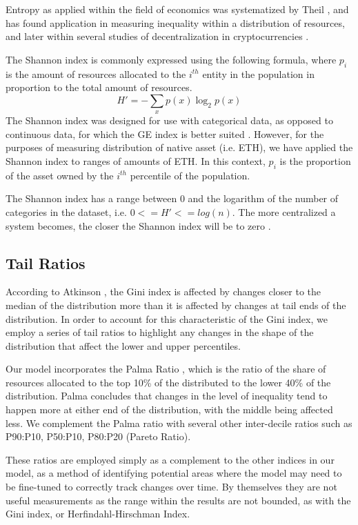 \documentclass[conference]{IEEEtran}
\begin{document}
Entropy as applied within the field of economics was systematized by Theil \cite{theil1967economics}, and has found application in measuring inequality within a distribution of resources, and later within several studies of decentralization in cryptocurrencies \cite{zhang2022sok, gochhayat2020measuring, kusmierz2022centralized}.

The Shannon index is commonly expressed using the following formula, where $p_{i}$ is the amount of resources allocated to the $i^{th}$ entity in the population in proportion to the total amount of resources.
\[H' = - \sum_{x} p(x) \log_{2} p(x)\]
The Shannon index was designed for use with categorical data, as opposed to continuous data, for which the  GE index is better suited \cite{tran2021harnessing}.   However, for the purposes of measuring distribution of native asset (i.e. ETH), we have applied the Shannon index to ranges of amounts of ETH.  In this context, $p_i$ is the proportion of the asset owned by the $i^{th}$ percentile of the population.

The Shannon index has a range between 0 and the logarithm of the number of categories in the dataset, i.e. $0<=H'<=log(n)$.  The more centralized a system becomes, the closer the Shannon index will be to zero \cite{kusmierz2022centralized}.

\subsection{Tail Ratios}

According to Atkinson \cite{atkinson1970measurement}, the Gini index is affected by changes closer to the median of the distribution more than it is affected by changes at tail ends of the distribution.  In order to account for this characteristic of the Gini index, we employ a series of tail ratios to highlight any changes in the shape of the distribution that affect the lower and upper percentiles.

Our model incorporates the Palma Ratio \cite{palma2011homogeneous}, which is the ratio of the share of resources allocated to the top 10\% of the distributed to the lower 40\% of the distribution.  Palma concludes that changes in the level of inequality tend to happen more at either end of the distribution, with the middle being affected less.  We complement the Palma ratio with several other inter-decile ratios such as P90:P10, P50:P10, P80:P20 (Pareto Ratio).

These ratios are employed simply as a complement to the other indices in our model, as a method of identifying potential areas where the model may need to be fine-tuned to correctly track changes over time.  By themselves they are not useful measurements as the range within the results are not bounded, as with the Gini index, or Herfindahl-Hirschman Index.
\end{document}
